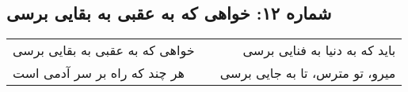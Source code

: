 \begin{center}
\section*{شماره ۱۲: خواهی که به عقبی به بقایی برسی}
\label{sec:012}
\begin{longtable}{l p{0.5cm} r}
خواهی که به عقبی به بقایی برسی
&&
باید که به دنیا به فنایی برسی
\\
هر چند که راه بر سر آدمی است
&&
میرو، تو مترس، تا به جایی برسی
\\
\end{longtable}
\end{center}
